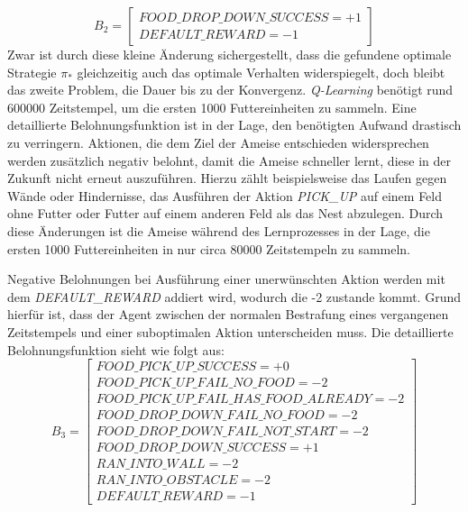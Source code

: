 \begin{equation}
    B_{2} =  \begin{bmatrix} 
        FOOD\_DROP\_DOWN\_SUCCESS = +1\\
        DEFAULT\_REWARD = -1          
 \end{bmatrix}
\end{equation}
Zwar ist durch diese kleine Änderung sichergestellt, dass die gefundene optimale Strategie $\pi_*$ gleichzeitig auch das optimale Verhalten widerspiegelt, doch bleibt das zweite Problem, die Dauer bis zu der Konvergenz. \textit{Q-Learning} benötigt rund $600000$ Zeitstempel, um die ersten 1000 Futtereinheiten zu sammeln. Eine detaillierte Belohnungsfunktion ist in der Lage, den benötigten Aufwand drastisch zu verringern. Aktionen, die dem Ziel der Ameise entschieden widersprechen werden zusätzlich negativ belohnt, damit die Ameise schneller lernt, diese in der Zukunft nicht erneut auszuführen. Hierzu zählt beispielsweise das Laufen gegen Wände oder Hindernisse, das Ausführen der Aktion \textit{PICK\_UP} auf einem Feld ohne Futter oder Futter auf einem anderen Feld als das Nest abzulegen. Durch diese Änderungen ist die Ameise während des Lernprozesses in der Lage, die ersten 1000 Futtereinheiten in nur circa $80000$ Zeitstempeln zu sammeln. 
\par
Negative Belohnungen bei Ausführung einer unerwünschten Aktion werden mit dem \textit{DEFAULT\_REWARD} addiert wird, wodurch die -2 zustande kommt. Grund hierfür ist, dass der Agent zwischen der normalen \glqq Bestrafung\grqq{} eines vergangenen Zeitstempels und einer suboptimalen Aktion unterscheiden muss. Die detaillierte Belohnungsfunktion sieht wie folgt aus:
\begin{equation}
    B_{3} =  \begin{bmatrix} 
        FOOD\_PICK\_UP\_SUCCESS = +0\\
        FOOD\_PICK\_UP\_FAIL\_NO\_FOOD = -2 \\
        FOOD\_PICK\_UP\_FAIL\_HAS\_FOOD\_ALREADY = -2\\
        FOOD\_DROP\_DOWN\_FAIL\_NO\_FOOD = -2 \\
        FOOD\_DROP\_DOWN\_FAIL\_NOT\_START = -2 \\
        FOOD\_DROP\_DOWN\_SUCCESS = +1\\
        RAN\_INTO\_WALL = -2\\
        RAN\_INTO\_OBSTACLE = -2 \\
        DEFAULT\_REWARD = -1                  
 \end{bmatrix}
\end{equation}